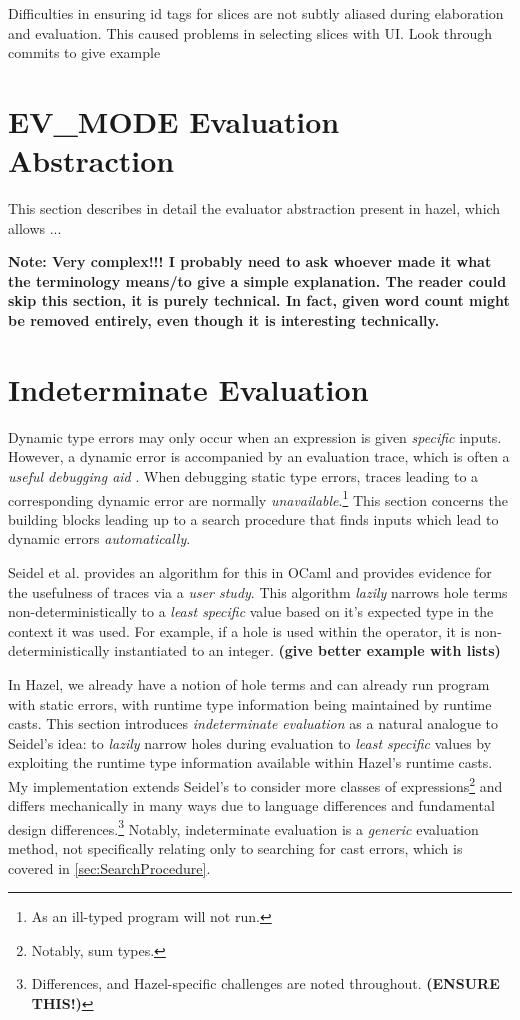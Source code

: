 Difficulties in ensuring id tags for slices are not subtly aliased during elaboration and evaluation. This caused problems in selecting slices with UI. Look through commits to give example

\section{EV\_MODE Evaluation Abstraction}
\label{sec:EVMode}
This section describes in detail the evaluator abstraction present in hazel, which allows ...

\textbf{Note: Very complex!!! I probably need to ask whoever made it what the terminology means/to give a simple explanation. The reader could skip this section, it is purely technical. In fact, given word count might be removed entirely, even though it is interesting technically.}

\section{Indeterminate Evaluation}\label{sec:IndetEval}
Dynamic type errors may only occur when an expression is given \textit{specific} inputs. However, a dynamic error is accompanied by an evaluation trace, which is often a \textit{useful debugging aid} \cite{TraceVisualisation}. When debugging static type errors, traces leading to a corresponding dynamic error are normally \textit{unavailable}.\footnote{As an ill-typed program will not run.} This section concerns the building blocks leading up to a search procedure that finds inputs which lead to dynamic errors \textit{automatically}.

Seidel et al. \cite{SearchProc} provides an algorithm for this in OCaml and provides evidence for the usefulness of traces via a \textit{user study}. This algorithm \textit{lazily} narrows hole terms non-deterministically to a \textit{least specific} value based on it's expected type in the context it was used. For example, if a hole is used within the \code{(+)} operator, it is non-deterministically instantiated to an integer. \textbf{(give better example with lists)}

In Hazel, we already have a notion of hole terms and can already run program with static errors, with runtime type information being maintained by runtime casts. This section introduces \textit{indeterminate evaluation} as a natural analogue to Seidel's idea: to \textit{lazily} narrow holes during evaluation to \textit{least specific} values by exploiting the runtime type information available within Hazel's runtime casts. My implementation extends Seidel's to consider more classes of expressions\footnote{Notably, sum types.} and differs mechanically in many ways due to language differences and fundamental design differences.\footnote{Differences, and Hazel-specific challenges are noted throughout. \textbf{(ENSURE THIS!)}} Notably, indeterminate evaluation is a \textit{generic} evaluation method, not specifically relating only to searching for cast errors, which is covered in \cref{sec:SearchProcedure}.

